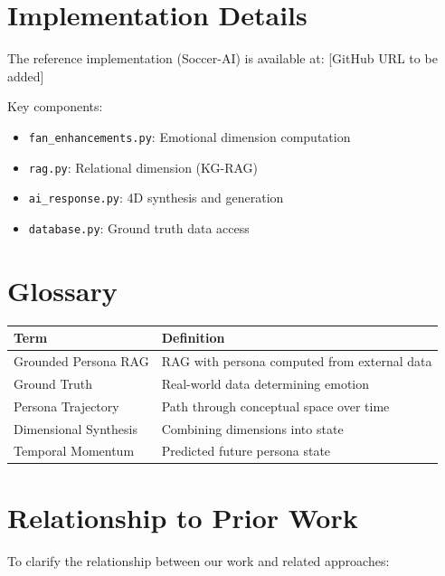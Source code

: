 \documentclass[11pt]{article}
\begin{document}
\appendix

\section{Implementation Details}

The reference implementation (Soccer-AI) is available at: [GitHub URL to be added]

Key components:
\begin{itemize}
    \item \texttt{fan\_enhancements.py}: Emotional dimension computation
    \item \texttt{rag.py}: Relational dimension (KG-RAG)
    \item \texttt{ai\_response.py}: 4D synthesis and generation
    \item \texttt{database.py}: Ground truth data access
\end{itemize}

\section{Glossary}

\begin{table}[h]
\centering
\begin{tabular}{ll}
\toprule
\textbf{Term} & \textbf{Definition} \\
\midrule
Grounded Persona RAG & RAG with persona computed from external data \\
Ground Truth & Real-world data determining emotion \\
Persona Trajectory & Path through conceptual space over time \\
Dimensional Synthesis & Combining dimensions into state \\
Temporal Momentum & Predicted future persona state \\
\bottomrule
\end{tabular}
\end{table}

\section{Relationship to Prior Work}

To clarify the relationship between our work and related approaches:
\end{document}
